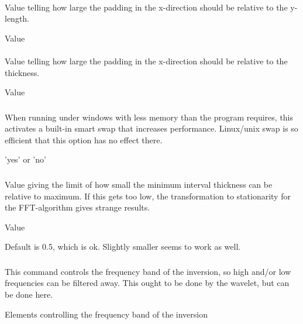 \paragraph{}
 \slist
   \item \Description Value telling how large the padding in the x-direction should be relative to the y-length.
   \item \Argument Value
   \item {}
 \elist

\paragraph{}
 \slist
   \item \Description Value telling how large the padding in the x-direction should be relative to the thickness.
   \item \Argument Value
   \item {}
 \elist

\subsubsection{} 
 \slist
   \item \Description When running under windows with less memory than the program requires, this activates a built-in smart swap that increases performance. Linux/unix swap is so efficient that this option has no effect there.
   \item \Argument 'yes' or 'no'
   \item \Default
 \elist

\subsubsection{}
 \slist
   \item \Description Value giving the limit of how small the minimum interval thickness can be relative to maximum. If this gets too low, the transformation to stationarity for the FFT-algorithm gives strange results.
   \item \Argument Value
   \item \Default Default is 0.5, which is ok. Slightly smaller seems to work as well.
 \elist

\subsubsection{}
 \slist
   \item \Description This command controls the frequency band of the inversion, so high and/or low frequencies can be filtered away. This ought to be done by the wavelet, but can be done here.
   \item \Argument Elements controlling the frequency band of the inversion
   \item \Default
 \elist

